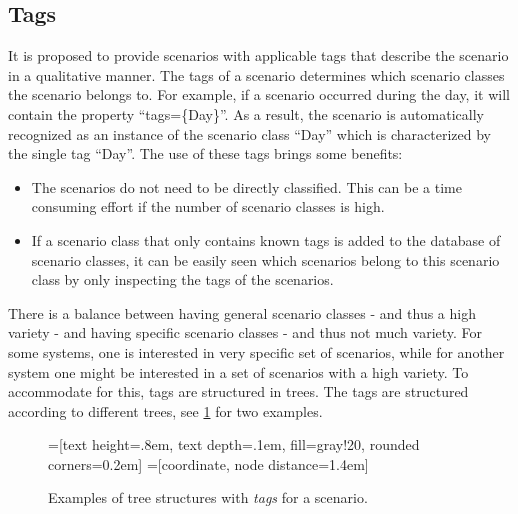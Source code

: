 \cbstart

\subsection{Tags}
\label{sec:tags}

It is proposed to provide scenarios with applicable tags that describe the scenario in a qualitative manner. The tags of a scenario determines which scenario classes the scenario belongs to. For example, if a scenario occurred during the day, it will contain the property ``tags=\{Day\}''. As a result, the scenario is automatically recognized as an instance of the scenario class ``Day'' which is characterized by the single tag ``Day''. The use of these tags brings some benefits:
\begin{itemize}
	\item The scenarios do not need to be directly classified. This can be a time consuming effort if the number of scenario classes is high.
	\item If a scenario class that only contains known tags is added to the database of scenario classes, it can be easily seen which scenarios belong to this scenario class by only inspecting the tags of the scenarios.
\end{itemize}

There is a balance between having general scenario classes - and thus a high variety - and having specific scenario classes - and thus not much variety. For some systems, one is interested in very specific set of scenarios, while for another system one might be interested in a set of scenarios with a high variety. To accommodate for this, tags are structured in trees. The tags are structured according to different trees, see \cref{fig:tag trees} for two examples. 

\begin{figure}
	\centering
	=[text height=.8em, text depth=.1em, fill=gray!20, rounded corners=0.2em]
	=[coordinate, node distance=1.4em]
	 \\
	\caption{Examples of tree structures with \emph{tags} for a scenario.}
	\label{fig:tag trees}
\end{figure}

